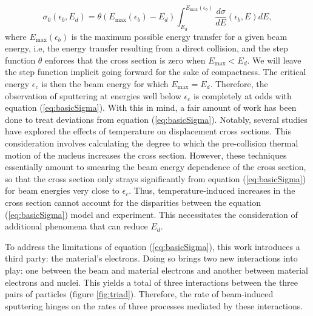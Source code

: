 \documentclass{article}
\begin{document}
\begin{equation}
  \sigma_0(\epsilon_b, {E}_d)
  =
  \theta(E_\text{max}(\epsilon_b) - E_d)
  \int_{E_d}^{E_\text{max}(\epsilon_b)}
  \frac{d\sigma}{dE}(\epsilon_b, E)
  dE,
  \label{eq:basicSigma}
\end{equation}
%
where $E_\text{max}(\epsilon_b)$
is the maximum possible energy transfer for a given beam energy, i.e, the
energy transfer resulting from a direct collision, and the step function
$\theta$ enforces that the cross section is zero when $E_\text{max} < E_d$.
We will leave the step function implicit going forward for the sake of
compactness.
The critical energy $\epsilon_c$ is then the beam energy for which
$E_\text{max}=E_d$.
Therefore, the observation of sputtering at energies well below $\epsilon_c$ is
completely at odds with equation (\ref{eq:basicSigma}).
With this in mind, a fair amount of work has been done to treat deviations from
equation (\ref{eq:basicSigma}).
Notably, several studies have explored the effects of temperature on
displacement cross sections. \cite{Meyer2012,Susi2016,Yoshimura2018}
This consideration involves calculating the degree to which the pre-collision
thermal motion of the nucleus increases the cross section.
However, these techniques essentially amount to smearing the beam energy
dependence of the cross section, so that the cross section only strays
significantly from equation (\ref{eq:basicSigma}) for beam energies very close
to $\epsilon_c$.
Thus, temperature-induced increases in the cross section cannot account for the
disparities between the equation (\ref{eq:basicSigma}) model and
experiment.
This necessitates the consideration of additional phenomena that can reduce
$E_d$.

To address the limitations of equation (\ref{eq:basicSigma}), this work
introduces a third party: the material's electrons.
Doing so brings two new interactions into play: one between the beam and
material electrons and another between material electrons and nuclei.
This yields a total of three interactions between the three pairs of particles
(figure \ref{fig:triad}).
Therefore, the rate of beam-induced sputtering hinges on the rates of three
processes mediated by these interactions.
\end{document}
